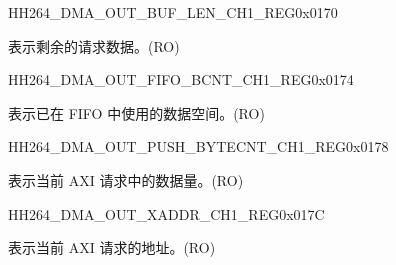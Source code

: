     \begin{register}{H}{H264\_DMA\_OUT\_BUF\_LEN\_CH1\_REG}{0x0170}\label{regdesc:H264DMAOUTBUFLENCH1REG}
    \regnewline%
    \begin{regdesc}\begin{reglist}
    \label{fielddesc:H264DMAOUTCMDFIFOBUFLENHBCH1}\item [H264\_DMA\_OUT\_CMDFIFO\_BUF\_LEN\_HB\_CH1] 表示剩余的请求数据。(RO)
    \end{reglist}\end{regdesc}
    \end{register}
    
    
    \begin{register}{H}{H264\_DMA\_OUT\_FIFO\_BCNT\_CH1\_REG}{0x0174}\label{regdesc:H264DMAOUTFIFOBCNTCH1REG}
    \regnewline%
    \begin{regdesc}\begin{reglist}
    \label{fielddesc:H264DMAOUTCMDFIFOOUTFIFOBCNTCH1}\item [H264\_DMA\_OUT\_CMDFIFO\_OUTFIFO\_BCNT\_CH1] 表示已在 FIFO 中使用的数据空间。(RO)
    \end{reglist}\end{regdesc}
    \end{register}
    
    
    \begin{register}{H}{H264\_DMA\_OUT\_PUSH\_BYTECNT\_CH1\_REG}{0x0178}\label{regdesc:H264DMAOUTPUSHBYTECNTCH1REG}
    \regnewline%
    \begin{regdesc}\begin{reglist}
    \label{fielddesc:H264DMAOUTCMDFIFOPUSHBYTECNTCH1}\item [H264\_DMA\_OUT\_CMDFIFO\_PUSH\_BYTECNT\_CH1] 表示当前 AXI 请求中的数据量。(RO)
    \end{reglist}\end{regdesc}
    \end{register}
    
    
    \begin{register}{H}{H264\_DMA\_OUT\_XADDR\_CH1\_REG}{0x017C}\label{regdesc:H264DMAOUTXADDRCH1REG}
    \regnewline%
    \begin{regdesc}\begin{reglist}
    \label{fielddesc:H264DMAOUTCMDFIFOXADDRCH1}\item [H264\_DMA\_OUT\_CMDFIFO\_XADDR\_CH1] 表示当前 AXI 请求的地址。(RO)
    \end{reglist}\end{regdesc}
    \end{register}
    
